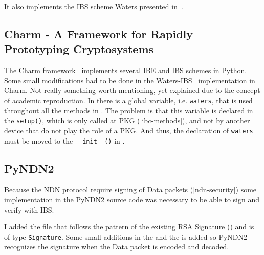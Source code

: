 It also implements the \gls{IBS} scheme Waters presented in~\cite{DBLP:journals/iacr/Waters04}. 

\subsection{Charm - A Framework for Rapidly Prototyping Cryptosystems}
The Charm framework~\cite{charm13} implements several \gls{IBE} and \gls{IBS} schemes in Python.
Some small modifications had to be done in the Waters-\gls{IBS}~\cite{DBLP:journals/iacr/Waters04} implementation in Charm.
Not really something worth mentioning, yet explained due to the concept of academic reproduction. 
In  there is a global variable, i.e. \texttt{waters}, that is used throughout all the methods in .
The problem is that this variable is declared in the \texttt{setup()}, which is only called at \gls{PKG} (\autoref{ibc-methods}), and not by another device that do not play the role of a \gls{PKG}. 
And thus, the declaration of \texttt{waters} must be moved to the \texttt{\_\_init\_\_()} in .

\subsection{PyNDN2}
Because the \gls{NDN} protocol require signing of Data packets (\autoref{ndn-security}) some implementation in the \gls{PyNDN2} source code was necessary to be able to sign and verify with \gls{IBS}.

I added the  file that follows the pattern of the existing RSA Signature () and is of type \texttt{Signature}.
Some small additions in the  and the  is added so \gls{PyNDN2} recognizes the signature when the Data packet is encoded and decoded.




